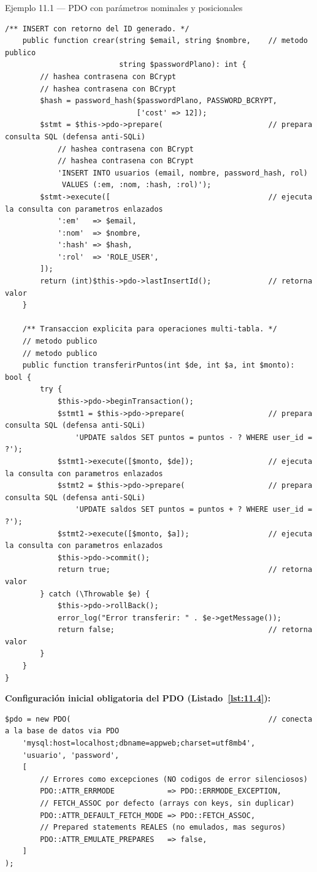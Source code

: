 \documentclass[11pt,a4paper,openany]{book}
\begin{document}
\begin{cajaejemplo}{Ejemplo 11.1 --- PDO con parámetros nominales y posicionales}
\begin{lstlisting}[style=php,caption={UsuarioRepository.php},label=lst:11.3]
    /** INSERT con retorno del ID generado. */
    public function crear(string $email, string $nombre,    // metodo publico
                          string $passwordPlano): int {
        // hashea contrasena con BCrypt
        // hashea contrasena con BCrypt
        $hash = password_hash($passwordPlano, PASSWORD_BCRYPT,
                              ['cost' => 12]);
        $stmt = $this->pdo->prepare(                        // prepara consulta SQL (defensa anti-SQLi)
            // hashea contrasena con BCrypt
            // hashea contrasena con BCrypt
            'INSERT INTO usuarios (email, nombre, password_hash, rol)
             VALUES (:em, :nom, :hash, :rol)');
        $stmt->execute([                                    // ejecuta la consulta con parametros enlazados
            ':em'   => $email,
            ':nom'  => $nombre,
            ':hash' => $hash,
            ':rol'  => 'ROLE_USER',
        ]);
        return (int)$this->pdo->lastInsertId();             // retorna valor
    }

    /** Transaccion explicita para operaciones multi-tabla. */
    // metodo publico
    // metodo publico
    public function transferirPuntos(int $de, int $a, int $monto): bool {
        try {
            $this->pdo->beginTransaction();
            $stmt1 = $this->pdo->prepare(                   // prepara consulta SQL (defensa anti-SQLi)
                'UPDATE saldos SET puntos = puntos - ? WHERE user_id = ?');
            $stmt1->execute([$monto, $de]);                 // ejecuta la consulta con parametros enlazados
            $stmt2 = $this->pdo->prepare(                   // prepara consulta SQL (defensa anti-SQLi)
                'UPDATE saldos SET puntos = puntos + ? WHERE user_id = ?');
            $stmt2->execute([$monto, $a]);                  // ejecuta la consulta con parametros enlazados
            $this->pdo->commit();
            return true;                                    // retorna valor
        } catch (\Throwable $e) {
            $this->pdo->rollBack();
            error_log("Error transferir: " . $e->getMessage());
            return false;                                   // retorna valor
        }
    }
}
\end{lstlisting}

\textbf{Configuración inicial obligatoria del PDO (Listado~\ref{lst:11.4}):}
\begin{lstlisting}[style=php,numbers=none,caption={Ejemplo de PHP},label=lst:11.4]
$pdo = new PDO(                                             // conecta a la base de datos via PDO
    'mysql:host=localhost;dbname=appweb;charset=utf8mb4',
    'usuario', 'password',
    [
        // Errores como excepciones (NO codigos de error silenciosos)
        PDO::ATTR_ERRMODE            => PDO::ERRMODE_EXCEPTION,
        // FETCH_ASSOC por defecto (arrays con keys, sin duplicar)
        PDO::ATTR_DEFAULT_FETCH_MODE => PDO::FETCH_ASSOC,
        // Prepared statements REALES (no emulados, mas seguros)
        PDO::ATTR_EMULATE_PREPARES   => false,
    ]
);
\end{lstlisting}
\end{cajaejemplo}
\end{document}

